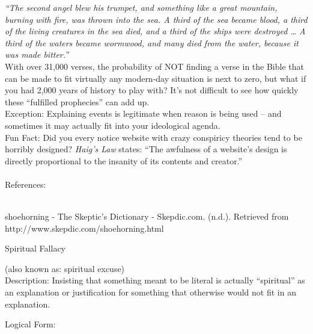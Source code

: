 \documentclass[a4paper,12pt,single,pdftex]{scrartcl}
\begin{document}
    
      {\em “The second angel blew his trumpet, and something like a great mountain, burning with fire, was thrown into the sea. A third of the sea became blood, a third of the living creatures in the sea died, and a third of the ships were destroyed … A third of the waters became wormwood, and many died from the water, because it was made bitter.” }
    \\

    
      With over 31,000 verses, the probability of NOT finding a verse in the Bible that can be made to fit virtually any modern-day situation is next to zero, but what if you had 2,000 years of history to play with?  It’s not difficult to see how quickly these “fulfilled prophecies” can add up.
    \\

    
      Exception: Explaining events is legitimate when reason is being used -- and sometimes it may actually fit into your ideological agenda.
    \\

    
      Fun Fact: Did you every notice website with crazy conspiricy theories tend to be horribly designed? {\em Haig’s Law} states: “The awfulness of a website's design is directly proportional to the insanity of its contents and creator.”
    \\

    
      
    \\

    References:

    
      
        
      \\

      
        
          shoehorning - The Skeptic’s Dictionary - Skepdic.com. (n.d.). Retrieved from http://www.skepdic.com/shoehorning.html
        
      
    
  

Spiritual Fallacy
    
      (also known as: spiritual excuse)
    \\

  
    Description: Insisting that something meant to be literal is actually “spiritual” as an explanation or justification for something that otherwise would not fit in an explanation.

    
      Logical Form:
    \\
\end{document}
